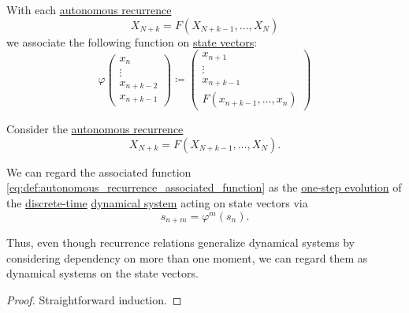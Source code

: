 \begin{definition}\label{def:autonomous_recurrence_associated_function}\mimprovised
  With each \hyperref[def:autonomous_recurrence_relation]{autonomous recurrence}
  \begin{equation*}
    X_{N+k} = F(X_{N+k-1}, \ldots, X_N)
  \end{equation*}
  we associate the following function on \hyperref[def:recurrence_relation/state]{state vectors}:
  \begin{equation}\label{eq:def:autonomous_recurrence_associated_function}
    \varphi
    \begin{pmatrix}
      x_n \\
      \vdots \\
      x_{n+k-2} \\
      x_{n+k-1}
    \end{pmatrix}
    \coloneqq
    \begin{pmatrix}
      x_{n+1} \\
      \vdots \\
      x_{n+k-1} \\
      F(x_{n+k-1}, \ldots, x_n)
    \end{pmatrix}
  \end{equation}
\end{definition}

\begin{proposition}\label{thm:autonomous_recurrence_as_dynamical_system}
  Consider the \hyperref[def:autonomous_recurrence_relation]{autonomous recurrence}
  \begin{equation*}
    X_{N+k} = F(X_{N+k-1}, \ldots, X_N).
  \end{equation*}

  We can regard the associated function \eqref{eq:def:autonomous_recurrence_associated_function} as the \hyperref[def:one_step_evolution_function]{one-step evolution} of the \hyperref[def:discrete_dynamical_system]{discrete-time} \hyperref[def:dynamical_system]{dynamical system} acting on state vectors via
  \begin{equation*}
    s_{n+m} = \varphi^m(s_n).
  \end{equation*}
\end{proposition}
\begin{comments}
  \item Thus, even though recurrence relations generalize dynamical systems by considering dependency on more than one moment, we can regard them as dynamical systems on the state vectors.
\end{comments}
\begin{proof}
  Straightforward induction.
\end{proof}


